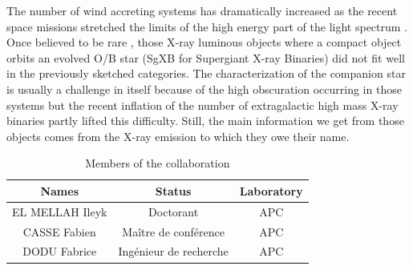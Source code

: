 \documentclass[
    a4paper, 
    12pt, onecolumn,
]{article}
\begin{document}

\indent \indent The number of wind accreting systems has dramatically increased as the recent space missions stretched the limits of the high energy part of the light spectrum \citep{Liu2006,Walter15}. Once believed to be rare \citep{Illarionov1975}, those X-ray luminous objects where a compact object orbits an evolved {\sc O}/{\sc B} star (SgXB for Supergiant X-ray Binaries) did not fit well in the previously sketched categories. The characterization of the companion star is usually a challenge in itself because of the high obscuration occurring in those systems but the recent inflation of the number of extragalactic high mass X-ray binaries partly lifted this difficulty. Still, the main information we get from those objects comes from the X-ray emission to which they owe their name.\\
\begin{table}[h]
\centering
\begin{tabular}{||c|c|c||}
\hline\hline
Names & Status & Laboratory \\\hline
EL MELLAH Ileyk & Doctorant & APC\\ \hline 
CASSE Fabien & Ma\^itre de conf\'erence & APC \\ \hline
DODU Fabrice & Ing\'enieur de recherche &APC \\ \hline
\hline\hline
\end{tabular}
\caption{Members of the collaboration}
\end{table}
\end{document}
